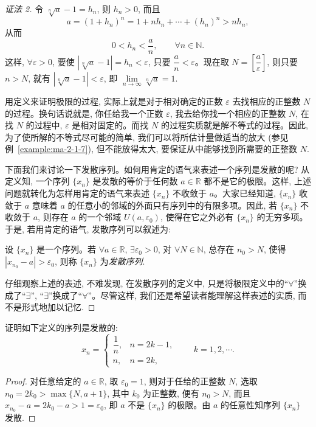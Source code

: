 \begin{proof}[{证法 2}]
令 $\sqrt[n]{a}-1=h_n$, 则 $h_n>0$, 而且
\[
  a=(1+h_n)^n=1+nh_n+\cdots+(h_n)^n>nh_n,
\]
从而
\[
  0<h_n<\frac an,\qquad \forall n\in\mathbb{N}.
\]
这样, $\forall\varepsilon>0$, 要使 $|\sqrt[n]{a}-1|=h_n<\varepsilon$, 只要 $\dfrac an<\varepsilon$。现在取 $N=\left[\dfrac a\varepsilon\right]$, 则只要 $n>N$, 就有 $|\sqrt[n]{a}-1|<\varepsilon$, 即 $\lim\limits_{n\to\infty}\sqrt[n]{a}=1$.

用定义来证明极限的过程, 实际上就是对于相对确定的正数 $\varepsilon$ 去找相应的正整数 $N$ 的过程。换句话说就是, 你任给我一个正数 $\varepsilon$, 我去给你找一个相应的正整数 $N$, 在找 $N$ 的过程中, $\varepsilon$ 是相对固定的。而找 $N$ 的过程实质就是解不等式的过程。因此, 为了使所解的不等式尽可能的简单, 我们可以将所估计量做适当的放大 (参见例~\ref{example:ma-2-1-7}), 但不能放得太大, 要保证从中能够找到所需要的正整数 $N$.

下面我们来讨论一下发散序列。如何用肯定的语气来表述一个序列是发散的呢? 从定义知, 一个序列 $\{x_n\}$ 是发散的等价于任何数 $a\in\mathbb{R}$ 都不是它的极限。这样, 上述问题就转化为怎样用肯定的语气来表述 $\{x_n\}$ 不收敛于 $a$。大家已经知道, $\{x_n\}$ 收敛于 $a$ 意味着 $a$ 的任意小的邻域的外面只有序列中的有限多项。因此, 若 $\{x_n\}$ 不收敛于 $a$, 则存在 $a$ 的一个邻域 $U(a,\varepsilon_0)$, 使得在它之外必有 $\{x_n\}$ 的无穷多项。于是, 若用肯定的语气, 发散序列可以叙述为:

设 $\{x_n\}$ 是一个序列。若 $\forall a\in\mathbb{R}$, $\exists\varepsilon_0>0$, 对 $\forall N\in\mathbb{N}$, 总存在 $n_0>N$, 使得 $|x_{n_0}-a|>\varepsilon_0$, 则称 $\{x_n\}$ 为\emph{发散序列}.

仔细观察上述的表述, 不难发现, 在发散序列的定义中, 只是将极限定义中的``$\forall$''换成了``$\exists$'', ``$\exists$''换成了``$\forall$''。尽管这样, 我们还是希望读者能理解这样表述的实质, 而不是形式地加以记忆.
\end{proof}


\begin{example}\label{example:ma-2-1-9}
证明如下定义的序列是发散的:
\[
  x_n=
  \begin{cases}
    \dfrac1n, & n=2k-1,\\
    n, & n=2k,
  \end{cases}
  \qquad k=1,2,\cdots .
\]
\end{example}


\begin{proof}
对任意给定的 $a\in\mathbb{R}$, 取 $\varepsilon_0=1$, 则对于任给的正整数 $N$, 选取 $n_0=2k_0>\max\{N,a+1\}$, 其中 $k_0$ 为正整数, 便有 $n_0>N$, 而且 $x_{n_0}-a=2k_0-a>1=\varepsilon_0$, 即 $a$ 不是 $\{x_n\}$ 的极限。由 $a$ 的任意性知序列 $\{x_n\}$ 发散.
\end{proof}


